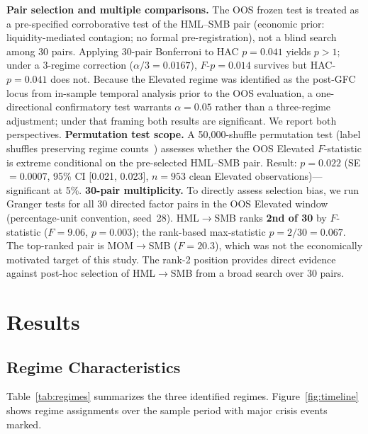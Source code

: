 \documentclass[sigconf,anonymous]{acmart}
\begin{document}
\textbf{Pair selection and multiple comparisons.} The OOS frozen test is treated
as a pre-specified corroborative test of the HML--SMB pair (economic prior:
liquidity-mediated contagion; no formal pre-registration), not a blind search among
30 pairs. Applying 30-pair Bonferroni to HAC $p = 0.041$ yields $p > 1$; under
a 3-regime correction ($\alpha/3 = 0.0167$), $F$-$p = 0.014$ survives but
HAC-$p = 0.041$ does not. Because the Elevated regime was identified as the
post-GFC locus from in-sample temporal analysis prior to the OOS evaluation,
a one-directional confirmatory test warrants $\alpha = 0.05$ rather than a
three-regime adjustment; under that framing both results are significant. We
report both perspectives.
\textbf{Permutation test scope.} A 50{,}000-shuffle permutation test
(label shuffles preserving regime counts~\cite{good2005permutation}) assesses
whether the OOS Elevated $F$-statistic is extreme conditional on the pre-selected
HML--SMB pair.
Result: $p = 0.022$ (SE $= 0.0007$, 95\% CI [0.021, 0.023], $n = 953$ clean Elevated observations)---significant at 5\%.
\textbf{30-pair multiplicity.} To directly assess selection bias, we run Granger
tests for all 30 directed factor pairs in the OOS Elevated window (percentage-unit
convention, seed~28). HML$\to$SMB ranks \textbf{2nd of 30} by $F$-statistic
($F = 9.06$, $p = 0.003$); the rank-based max-statistic $p = 2/30 = 0.067$.
The top-ranked pair is MOM$\to$SMB ($F = 20.3$), which was not the
economically motivated target of this study.
The rank-2 position provides direct evidence against post-hoc selection of HML$\to$SMB
from a broad search over 30 pairs.

\section{Results}

\subsection{Regime Characteristics}

Table~\ref{tab:regimes} summarizes the three identified regimes. Figure~\ref{fig:timeline}
shows regime assignments over the sample period with major crisis events marked.
\end{document}
